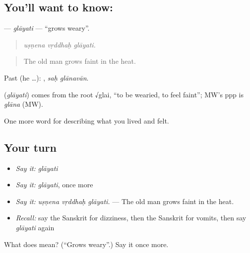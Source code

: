 \subsection*{You'll want to know: }
\textbf{} — \emph{glāyati} — \textquotedblleft{}grows weary\textquotedblright{}.

\begin{quote}
  
\end{quote}

\begin{quote}
\emph{uṣṇena vṛddhaḥ glāyati.}
\end{quote}

\begin{quote}
The old man grows faint in the heat.
\end{quote}

Past (he …):  , \emph{saḥ glānavān}.

\begin{cousinweb}
\textbf{} (\emph{glāyati}) comes from the root √glai, \textquotedblleft{}to be wearied, to feel faint\textquotedblright{}; MW's ppp is \emph{glāna} (MW).
\end{cousinweb}

\begin{grammarlens}[title={What you've built}]
One more word for describing what you lived and felt.
\end{grammarlens}

\subsection*{Your turn}
\begin{itemize}
\raggedright
  \item \emph{Say it:} \emph{glāyati}
  \item \emph{Say it:} \emph{glāyati}, once more
  \item \emph{Say it:} \emph{uṣṇena vṛddhaḥ glāyati.} — The old man grows faint in the heat.
  \item \emph{Recall:} say the Sanskrit for dizziness, then the Sanskrit for vomits, then say \emph{glāyati} again
\end{itemize}

\begin{tcolorbox}[breakable,colback=teal!4,colframe=teal!35!black,title={Before you move on}]
What does  mean? (\textquotedblleft{}Grows weary\textquotedblright{}.) Say it once more.
\end{tcolorbox}
